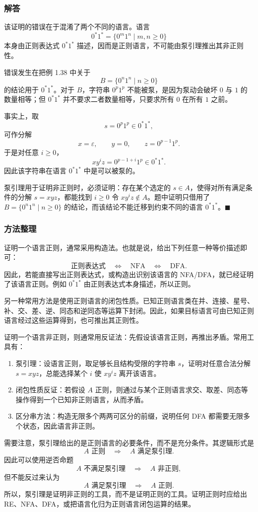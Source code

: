 \begin{answerred}
\subsubsection*{解答}

该证明的错误在于混淆了两个不同的语言。语言
\[
    0^*1^*=\{0^m1^n \mid m,n\ge 0\}
\]
本身由正则表达式 $0^*1^*$ 描述，因而是正则语言，不可能由泵引理推出其非正则性。

错误发生在把例 1.38 中关于
\[
    B=\{0^n1^n \mid n\ge 0\}
\]
的结论用于 $0^*1^*$。对于 $B$，字符串 $0^p1^p$ 不能被泵，是因为泵动会破坏 $0$ 与 $1$ 的数量相等；但 $0^*1^*$ 并不要求二者数量相等，只要求所有 $0$ 在所有 $1$ 之前。

事实上，取
\[
    s=0^p1^p \in 0^*1^*,
\]
可作分解
\[
    x=\varepsilon,\qquad y=0,\qquad z=0^{p-1}1^p.
\]
于是对任意 $i\ge 0$，
\[
    xy^iz=0^{p-1+i}1^p \in 0^*1^*.
\]
因此该字符串在语言 $0^*1^*$ 中是可以被泵的。

泵引理用于证明非正则时，必须证明：存在某个选定的 $s\in A$，使得对所有满足条件的分解 $s=xyz$，都能找到 $i\ge 0$ 令 $xy^iz\notin A$。题中证明只借用了 $B=\{0^n1^n\mid n\ge 0\}$ 的结论，而该结论不能迁移到约束不同的语言 $0^*1^*$。$\blacksquare$

\subsubsection*{方法整理}

证明一个语言正则，通常采用构造法。也就是说，给出下列任意一种等价描述即可：
\[
    \text{正则表达式}\quad\Longleftrightarrow\quad
    \text{NFA}\quad\Longleftrightarrow\quad
    \text{DFA}.
\]
因此，若能直接写出正则表达式，或构造出识别该语言的 NFA/DFA，就已经证明了该语言正则。例如 $0^*1^*$ 由正则表达式本身描述，所以正则。

另一种常用方法是使用正则语言的闭包性质。已知正则语言类在并、连接、星号、补、交、差、逆、同态和逆同态等运算下封闭。因此，如果目标语言可由已知正则语言经过这些运算得到，也可推出其正则性。

证明一个语言非正则，则通常用反证法：先假设该语言正则，再推出矛盾。常用工具有：
\begin{enumerate}[label=(\arabic*), leftmargin=2.5em]
    \item 泵引理：设语言正则，取足够长且结构受限的字符串 $s$，证明对任意合法分解 $s=xyz$，总能选择某个 $i$ 使 $xy^iz$ 离开该语言。
    \item 闭包性质反证：若假设 $A$ 正则，则通过与某个正则语言求交、取差、同态等操作得到一个已知非正则语言，从而矛盾。
    \item 区分串方法：构造无限多个两两可区分的前缀，说明任何 DFA 都需要无限多个状态，因此语言非正则。
\end{enumerate}

需要注意，泵引理给出的是正则语言的必要条件，而不是充分条件。其逻辑形式是
\[
    A\text{ 正则}\quad\Longrightarrow\quad A\text{ 满足泵引理}.
\]
因此可以使用逆否命题
\[
    A\text{ 不满足泵引理}\quad\Longrightarrow\quad A\text{ 非正则},
\]
但不能反过来认为
\[
    A\text{ 满足泵引理}\quad\Longrightarrow\quad A\text{ 正则}.
\]
所以，泵引理是证明非正则的工具，而不是证明正则的工具。证明正则时应给出 RE、NFA、DFA，或把语言化归为正则语言闭包运算的结果。

\end{answerred}
